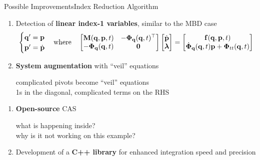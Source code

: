 \begin{frame}{Possible Improvements}{Index Reduction Algorithm}
    \begin{enumerate}
      \item<1-2> Detection of \textbf{linear index-1 variables}, similar to the \acs{MBD} case
      \begin{equation*}
        \begin{cases}
          \mathbf{q}^{\prime} = \mathbf{p} \\
          \mathbf{p}^{\prime} = \dot{\mathbf{p}}
        \end{cases}
        \text{where} \quad
        \begin{bmatrix}
          \mathbf{M}(\mathbf{q}, \mathbf{p}, t)      & -\boldsymbol{\Phi}_{\mathbf{q}}(\mathbf{q}, t)^{\top} \\
          -\boldsymbol{\Phi}_{\mathbf{q}}(\mathbf{q}, t) & \mathbf{0}
        \end{bmatrix}
        \begin{bmatrix}
          \dot{\mathbf{p}} \\ \boldsymbol{\lambda}
        \end{bmatrix} = \begin{bmatrix}
          \mathbf{f}(\mathbf{q}, \mathbf{p}, t) \\
          \dot{\boldsymbol{\Phi}}_{\mathbf{q}}(\mathbf{q}, t)\mathbf{p} + \boldsymbol{\Phi}_{tt}(\mathbf{q}, t)
        \end{bmatrix}
      \end{equation*}
      \item<2> \textbf{System augmentation} with ``veil'' equations \\
      \begin{small}
        \qquad complicated pivots become ``veil'' equations \\
        \qquad 1s in the diagonal, complicated terms on the RHS
      \end{small}
    \end{enumerate}
    \begin{enumerate}
      \item<3> \textbf{Open-source} \acs{CAS} \\
      \begin{small}
        \qquad what is happening inside? \\
        \qquad why is it not working on this example?
      \end{small}
      \item<4> Development of a \textbf{C++ library} for enhanced integration speed and precision
    \end{enumerate}
\end{frame}

